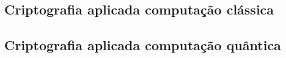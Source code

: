 \subsection{Criptografia aplicada computação clássica}
\subsection{Criptografia aplicada computação quântica}
\newpage

